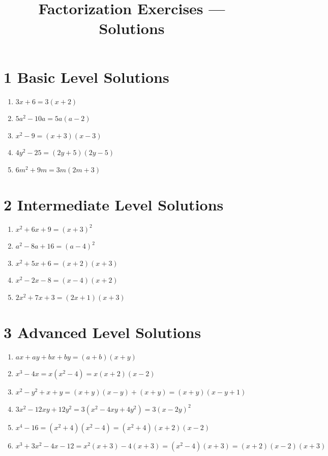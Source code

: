 \documentclass[12pt,a4paper,]{article}
\title{Factorization Exercises — Solutions}
\author{}
\date{}
\begin{document}
	\maketitle
	\section{1 Basic Level Solutions}
	\begin{enumerate}
		\item \(3 x+6=3(x+2)\)
		\item \(5 a^{2}-10 a=5 a(a-2)\)
		\item \(x^{2}-9=(x+3)(x-3)\)
		\item \(4 y^{2}-25=(2 y+5)(2 y-5)\)
		\item \(6 m^{2}+9 m=3 m(2 m+3)\)
	\end{enumerate}
	
	\section{2 Intermediate Level Solutions}
	\begin{enumerate}
		\item \(x^{2}+6 x+9=(x+3)^{2}\)
		\item \(a^{2}-8 a+16=(a-4)^{2}\)
		\item \(x^{2}+5 x+6=(x+2)(x+3)\)
		\item \(x^{2}-2 x-8=(x-4)(x+2)\)
		\item \(2 x^{2}+7 x+3=(2 x+1)(x+3)\)
	\end{enumerate}
	
	\section{3 Advanced Level Solutions}
	\begin{enumerate}
		\item \(a x+a y+b x+b y=(a+b)(x+y)\)
		\item \(x^{3}-4 x=x\left(x^{2}-4\right)=x(x+2)(x-2)\)
		\item \(x^{2}-y^{2}+x+y=(x+y)(x-y)+(x+y)=(x+y)(x-y+1)\)
		\item \(3 x^{2}-12 x y+12 y^{2}=3\left(x^{2}-4 x y+4 y^{2}\right)=3(x-2 y)^{2}\)
		\item \(x^{4}-16=\left(x^{2}+4\right)\left(x^{2}-4\right)=\left(x^{2}+4\right)(x+2)(x-2)\)
		\item \(x^{3}+3 x^{2}-4 x-12=x^{2}(x+3)-4(x+3)=\left(x^{2}-4\right)(x+3)=(x+2)(x-2)(x+3)\)
	\end{enumerate}
	
\end{document}
